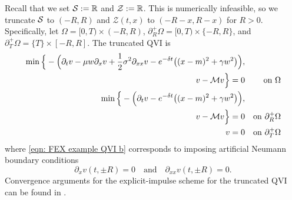 Recall that we set $\mathcal{S}:= \mathbb{R}$ and $\mathcal{Z} := \mathbb{R}$. This is numerically infeasible, so we truncate $\mathcal{S}$ to $(-R,R)$ and $\mathcal{Z}(t,x)$ to $(-R-x,R-x)$ for $R>0$. Specifically, let $\Omega = [0,T) \times (-R,R)$, $\partial_R^+ \Omega = [0,T)\times \{-R,R\}$, and $\partial_T^+ \Omega = \{T\} \times [-R,R]$. The truncated QVI is
\begin{subequations}\label{eqn: FEX example QVI}
\begin{align}
    \min \Big\{ - \Big( \partial_t v - \mu w \partial_x v + \frac{1}{2} \sigma^2 \partial_{xx} v - e^{-\delta t} \big( (x-m)^2 + \gamma w^2 \big) \Big), \nonumber\\
    v - \mathcal{M} v \Big\} = 0 && \text{on } \Omega \label{eqn: FEX example QVI a}\\
    \min \Big\{ - \Big( \partial_t v - e^{-\delta t} \big( (x-m)^2 + \gamma w^2 \big) \Big), \nonumber\\
    v - \mathcal{M} v \Big\} = 0 && \text{on } \partial_R^+ \Omega\label{eqn: FEX example QVI b}\\
    v = 0 && \text{on } \partial_T^+ \Omega \label{eqn: FEX example QVI c}
\end{align}
\end{subequations}
where \eqref{eqn: FEX example QVI b} corresponds to imposing artificial Neumann boundary conditions
\begin{equation*}
    \partial_xv(t,\pm R) = 0 \quad \text{and} \quad \partial_{xx}v(t,\pm R) = 0. 
\end{equation*}
Convergence arguments for the explicit-impulse scheme for the truncated QVI can be found in \cite[Appendix C]{azimzadeh2018impulsecontrolfinancenumerical}.

